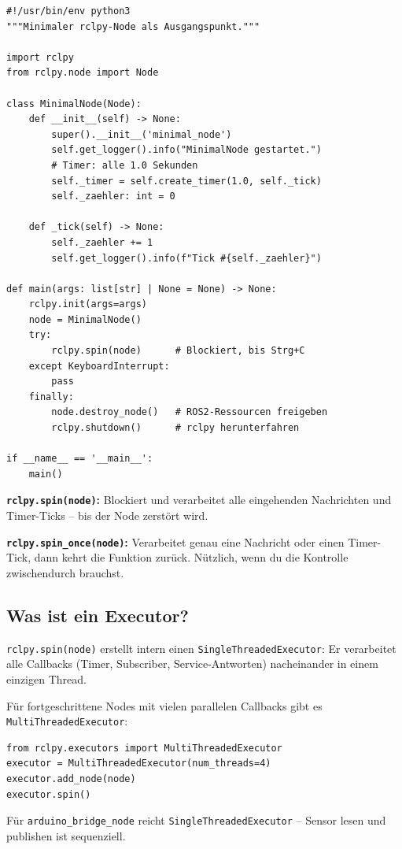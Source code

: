 \begin{wissenBox}
\begin{lstlisting}
#!/usr/bin/env python3
"""Minimaler rclpy-Node als Ausgangspunkt."""

import rclpy
from rclpy.node import Node

class MinimalNode(Node):
    def __init__(self) -> None:
        super().__init__('minimal_node')
        self.get_logger().info("MinimalNode gestartet.")
        # Timer: alle 1.0 Sekunden
        self._timer = self.create_timer(1.0, self._tick)
        self._zaehler: int = 0

    def _tick(self) -> None:
        self._zaehler += 1
        self.get_logger().info(f"Tick #{self._zaehler}")

def main(args: list[str] | None = None) -> None:
    rclpy.init(args=args)
    node = MinimalNode()
    try:
        rclpy.spin(node)      # Blockiert, bis Strg+C
    except KeyboardInterrupt:
        pass
    finally:
        node.destroy_node()   # ROS2-Ressourcen freigeben
        rclpy.shutdown()      # rclpy herunterfahren

if __name__ == '__main__':
    main()
\end{lstlisting}

\textbf{\texttt{rclpy.spin(node)}:} Blockiert und verarbeitet alle
eingehenden Nachrichten und Timer-Ticks -- bis der Node zerstört wird.

\textbf{\texttt{rclpy.spin\_once(node)}:} Verarbeitet genau eine Nachricht
oder einen Timer-Tick, dann kehrt die Funktion zurück.
Nützlich, wenn du die Kontrolle zwischendurch brauchst.
\end{wissenBox}

\subsection{Was ist ein Executor?}

\begin{haubeBox}
\texttt{rclpy.spin(node)} erstellt intern einen \texttt{SingleThreadedExecutor}:
Er verarbeitet alle Callbacks (Timer, Subscriber, Service-Antworten)
nacheinander in einem einzigen Thread.

Für fortgeschrittene Nodes mit vielen parallelen Callbacks
gibt es \texttt{MultiThreadedExecutor}:
\begin{lstlisting}
from rclpy.executors import MultiThreadedExecutor
executor = MultiThreadedExecutor(num_threads=4)
executor.add_node(node)
executor.spin()
\end{lstlisting}
Für \texttt{arduino\_bridge\_node} reicht \texttt{SingleThreadedExecutor} --
Sensor lesen und publishen ist sequenziell.
\end{haubeBox}

